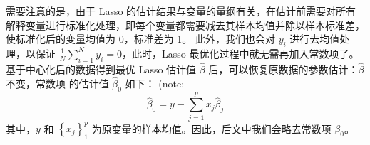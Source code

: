 需要注意的是，由于 Lasso 的估计结果与变量的量纲有关，在估计前需要对所有解释变量进行标准化处理，即每个变量都需要减去其样本均值并除以样本标准差，使标准化后的变量均值为 0，标准差为 1。 %
此外，我们也会对 $y_{i}$ 进行去均值处理，以保证 $\frac{1}{N} \sum_{i=1}^{N} y_{i}=0$，此时，Lasso 最优化过程中就无需再加入常数项了。
基于中心化后的数据得到最优 Lasso 估计值 $\widehat{\beta}$ 后，可以恢复原数据的参数估计：$\widehat{\beta}$ 不变，常数项 的估计值 $\widehat{\beta}_{0}$ 如下： (note: %
$$
\widehat{\beta}_{0}=\bar{y}-\sum_{j=1}^{p} \bar{x}_{j} \widehat{\beta}_{j}
$$
其中，$\bar{y}$ 和 $\left\{\bar{x}_{j}\right\}_{1}^{p}$ 为原变量的样本均值。因此，后文中我们会略去常数项 $\beta_{0}$。

